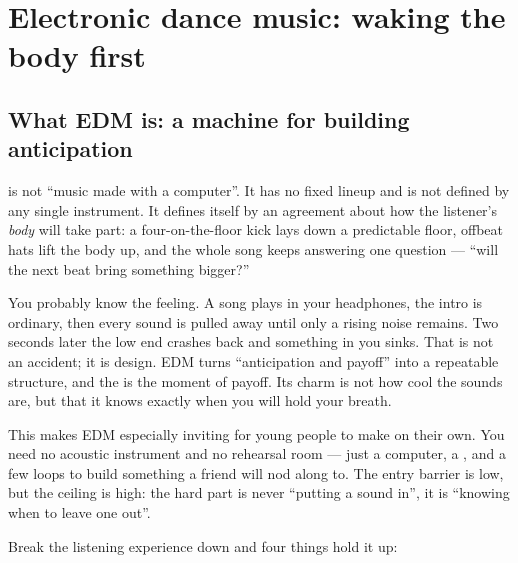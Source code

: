 \chapter{Electronic dance music: waking the body first}
\label{ch:genre-edm-deep}


\section{What EDM is: a machine for building anticipation}
\label{sec:edm-what}

 is not ``music made with a computer''. It has no fixed lineup and is not defined by any single instrument. It defines itself by an agreement about how the listener's \emph{body} will take part: a four-on-the-floor kick lays down a predictable floor, offbeat hats lift the body up, and the whole song keeps answering one question --- ``will the next beat bring something bigger?''

You probably know the feeling. A song plays in your headphones, the intro is ordinary, then every sound is pulled away until only a rising noise remains. Two seconds later the low end crashes back and something in you sinks. That is not an accident; it is design. EDM turns ``anticipation and payoff'' into a repeatable structure, and the  is the moment of payoff. Its charm is not how cool the sounds are, but that it knows exactly when you will hold your breath.

This makes EDM especially inviting for young people to make on their own. You need no acoustic instrument and no rehearsal room --- just a computer, a , and a few loops to build something a friend will nod along to. The entry barrier is low, but the ceiling is high: the hard part is never ``putting a sound in'', it is ``knowing when to leave one out''.

Break the listening experience down and four things hold it up:

